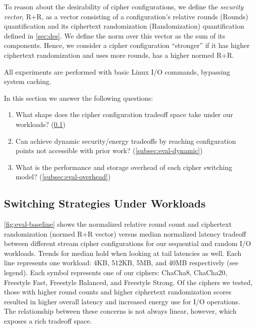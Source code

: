 To reason about the desirability of cipher configurations, we define the
\emph{security vector}, R+R, as a vector consisting of a configuration's
relative rounds (Rounds) quantification and its ciphertext randomization
(Randomization) quantification defined in \cref{sec:des}. We define the norm
over this vector as the sum of its components. Hence, we consider a cipher
configuration ``stronger'' if it has higher ciphertext randomization and uses
more rounds, \ie has a higher normed R+R.

All experiments are performed with basic Linux I/O commands, bypassing system
caching.

In this section we answer the following questions:

\begin{enumerate}
  \item What shape does the cipher configuration tradeoff space take under our
  workloads? (\cref{subsec:eval-baseline})
  \item Can \sys achieve dynamic security/energy tradeoffs by reaching
  configuration points not accessible with prior work?
  (\cref{subsec:eval-dynamic})
  \item What is the performance and storage overhead of each cipher switching
  model? (\cref{subsec:eval-overhead})
\end{enumerate}


\subsection{Switching Strategies Under Workloads}\label{subsec:eval-baseline}



\cref{fig:eval-baseline} shows the normalized relative round count and
ciphertext randomization (normed R+R vector) versus median normalized latency
tradeoff between different stream cipher configurations for our sequential and
random I/O workloads. Trends for median hold when looking at tail latencies as
well. Each line represents one workload: 4KB, 512KB, 5MB, and 40MB respectively
(see legend). Each symbol represents one of our ciphers: ChaCha8, ChaCha20,
Freestyle Fast, Freestyle Balanced, and Freestyle Strong. Of the ciphers we
tested, those with higher round counts and higher ciphertext randomization
scores resulted in higher overall latency and increased energy use for I/O
operations. The relationship between these concerns is not always linear,
however, which exposes a rich tradeoff space.

